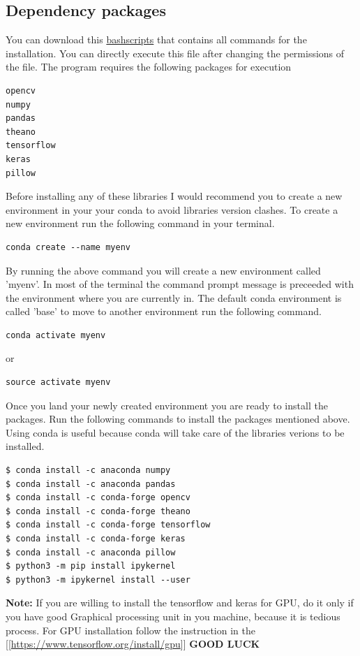 \documentclass[11pt]{article}
\begin{document}
\subsection*{Dependency packages}
\label{sec-6-4}
You can download this \href{https://github.com/pbcpraveen/I-Cell/blob/master/Introduction\%20to\%20Images/Installation/tensorlfow.sh}{bashscripts} that contains all commands for the installation.
You can directly execute this file after changing the permissions of the file.
The program requires the following packages for execution  
\begin{verbatim}
opencv
numpy
pandas
theano
tensorflow
keras
pillow
\end{verbatim}
Before installing any of these libraries I would recommend you to create a new environment
in your your conda to avoid libraries version clashes. To create a new environment run the following 
command in your terminal.
\begin{verbatim}
conda create --name myenv
\end{verbatim}
By running the above command you will create a new environment called 'myenv'. In most of the terminal
the command prompt message is preceeded with the environment where you are currently in. The default conda 
environment is called 'base' to move to another environment run the following command.
\begin{verbatim}
conda activate myenv
\end{verbatim}
or 
\begin{verbatim}
source activate myenv
\end{verbatim}
Once you land your newly created environment you are ready to install the packages. Run the following commands to install the
packages mentioned above. Using conda is useful because conda will take care of the libraries verions to be installed.  
\begin{verbatim}
$ conda install -c anaconda numpy 
$ conda install -c anaconda pandas 
$ conda install -c conda-forge opencv 
$ conda install -c conda-forge theano 
$ conda install -c conda-forge tensorflow 
$ conda install -c conda-forge keras
$ conda install -c anaconda pillow
$ python3 -m pip install ipykernel
$ python3 -m ipykernel install --user
\end{verbatim}


\textbf{\textbf{Note:}} If you are willing to install the tensorflow and keras for GPU, do it  
only if you have good Graphical processing unit in you machine, because it is  
tedious process. For GPU installation follow the instruction in the [[\url{https://www.tensorflow.org/install/gpu}]] 
\textbf{\textbf{GOOD LUCK}}
\newpage
\end{document}
